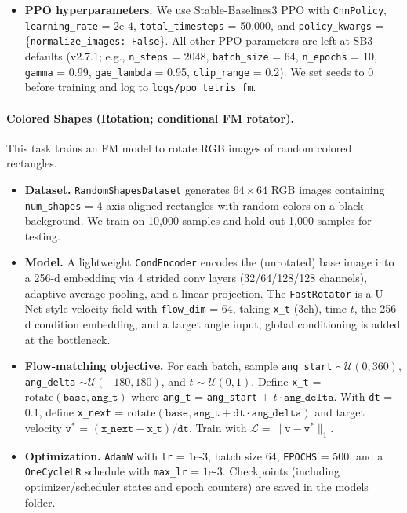 \documentclass{l4proj}
\begin{document}
\begin{itemize}
    \item \textbf{PPO hyperparameters.} We use Stable-Baselines3 PPO with \texttt{CnnPolicy}, \texttt{learning\_rate} = $\text{2e-4}$, \texttt{total\_timesteps} = 50{,}000, and \texttt{policy\_kwargs} = \{\texttt{normalize\_images: False}\}. All other PPO parameters are left at SB3 defaults (v2.7.1; e.g., \texttt{n\_steps} = 2048, \texttt{batch\_size} = 64, \texttt{n\_epochs} = 10, \texttt{gamma} = 0.99, \texttt{gae\_lambda} = 0.95, \texttt{clip\_range} = 0.2). We set seeds to 0 before training and log to \texttt{logs/\allowbreak ppo\_tetris\_fm}.
\end{itemize}

\paragraph{Colored Shapes (Rotation; conditional FM rotator).}
This task trains an FM model to rotate RGB images of random colored rectangles.
\begin{itemize}
    \item \textbf{Dataset.} \texttt{RandomShapesDataset} generates $64{\times}64$ RGB images containing \texttt{num\_shapes} = 4 axis-aligned rectangles with random colors on a black background. We train on 10{,}000 samples and hold out 1{,}000 samples for testing.
    \item \textbf{Model.} A lightweight \texttt{CondEncoder} encodes the (unrotated) base image into a 256-d embedding via 4 strided conv layers (32/64/128/128 channels), adaptive average pooling, and a linear projection. The \texttt{FastRotator} is a U-Net-style velocity field with \texttt{flow\_dim} = 64, taking \texttt{x\_t} (3ch), time $t$, the 256-d condition embedding, and a target angle input; global conditioning is added at the bottleneck.
    \item \textbf{Flow-matching objective.} For each batch, sample \texttt{ang\_start} $\sim \mathcal{U}(0,360)$, \texttt{ang\_delta} $\sim \mathcal{U}(-180,180)$, and $t \sim \mathcal{U}(0,1)$. Define \texttt{x\_t} = $\mathrm{rotate}(\texttt{base}, \texttt{ang\_t})$ where \texttt{ang\_t} = \texttt{ang\_start} + $t \cdot \texttt{ang\_delta}$. With \texttt{dt} = 0.1, define \texttt{x\_next} = $\mathrm{rotate}(\texttt{base}, \texttt{ang\_t} + \texttt{dt} \cdot \texttt{ang\_delta})$ and target velocity $\texttt{v}^*$ = $(\texttt{x\_next} - \texttt{x\_t}) / \texttt{dt}$. Train with $\mathcal{L} = \|\texttt{v} - \texttt{v}^*\|_1$.
    \item \textbf{Optimization.} \texttt{AdamW} with \texttt{lr} = $\text{1e-3}$, batch size 64, \texttt{EPOCHS} = 500, and a \texttt{OneCycleLR} schedule with \texttt{max\_lr} = $\text{1e-3}$. Checkpoints (including optimizer/scheduler states and epoch counters) are saved in the models folder.
\end{itemize}
\end{document}
